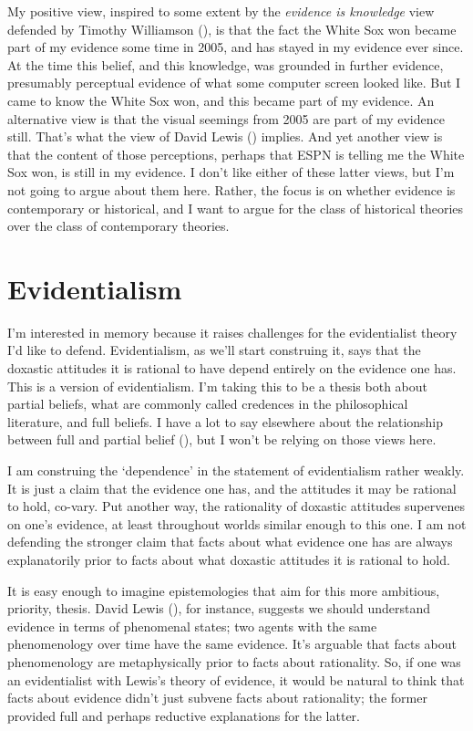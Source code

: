 \documentclass[
  10pt,
  letterpaper,
  DIV=11,
  numbers=noendperiod,
  twoside]{scrartcl}
\begin{document}
My positive view, inspired to some extent by the \emph{evidence is
knowledge} view defended by Timothy Williamson
(), is that the fact the White Sox
won became part of my evidence some time in 2005, and has stayed in my
evidence ever since. At the time this belief, and this knowledge, was
grounded in further evidence, presumably perceptual evidence of what
some computer screen looked like. But I came to know the White Sox won,
and this became part of my evidence. An alternative view is that the
visual seemings from 2005 are part of my evidence still. That's what the
view of David Lewis () implies. And yet
another view is that the content of those perceptions, perhaps that ESPN
is telling me the White Sox won, is still in my evidence. I don't like
either of these latter views, but I'm not going to argue about them
here. Rather, the focus is on whether evidence is contemporary or
historical, and I want to argue for the class of historical theories
over the class of contemporary theories.

\section{Evidentialism}\label{evidentialism}

I'm interested in memory because it raises challenges for the
evidentialist theory I'd like to defend. Evidentialism, as we'll start
construing it, says that the doxastic attitudes it is rational to have
depend entirely on the evidence one has. This is a version of
evidentialism. I'm taking this to be a thesis both about partial
beliefs, what are commonly called credences in the philosophical
literature, and full beliefs. I have a lot to say elsewhere about the
relationship between full and partial belief
(), but I won't be relying
on those views here.

I am construing the `dependence' in the statement of evidentialism
rather weakly. It is just a claim that the evidence one has, and the
attitudes it may be rational to hold, co-vary. Put another way, the
rationality of doxastic attitudes supervenes on one's evidence, at least
throughout worlds similar enough to this one. I am not defending the
stronger claim that facts about what evidence one has are always
explanatorily prior to facts about what doxastic attitudes it is
rational to hold.

It is easy enough to imagine epistemologies that aim for this more
ambitious, priority, thesis. David Lewis
(), for instance, suggests we should
understand evidence in terms of phenomenal states; two agents with the
same phenomenology over time have the same evidence. It's arguable that
facts about phenomenology are metaphysically prior to facts about
rationality. So, if one was an evidentialist with Lewis's theory of
evidence, it would be natural to think that facts about evidence didn't
just subvene facts about rationality; the former provided full and
perhaps reductive explanations for the latter.
\end{document}
